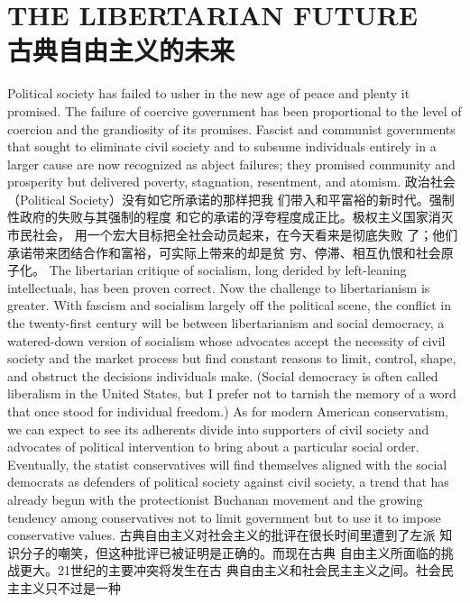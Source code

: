 \chapter{THE LIBERTARIAN FUTURE\\古典自由主义的未来}
\begin{paracol}{2}

Political society has failed to usher in the new age of
peace and plenty it promised. The failure of coercive
government has been proportional to the level of coercion and
the grandiosity of its promises. Fascist and communist governments that sought to eliminate civil society and to subsume individuals entirely in a larger cause are now recognized as abject
failures; they promised community and prosperity but delivered poverty, stagnation, resentment, and atomism.
\switchcolumn
政治社会（Political Society）没有如它所承诺的那样把我
们带入和平富裕的新时代。强制性政府的失败与其强制的程度
和它的承诺的浮夸程度成正比。极权主义国家消灭市民社会，
用一个宏大目标把全社会动员起来，在今天看来是彻底失败
了；他们承诺带来团结合作和富裕，可实际上带来的却是贫
穷、停滞、相互仇恨和社会原子化。
\switchcolumn*
The libertarian critique of socialism, long derided by left-leaning intellectuals, has been proven correct. Now the challenge to libertarianism is greater. With fascism and socialism
largely off the political scene, the conflict in the twenty-first
century will be between libertarianism and social democracy, a
watered-down version of socialism whose advocates accept the
necessity of civil society and the market process but find constant reasons to limit, control, shape, and obstruct the decisions
individuals make. (Social democracy is often called liberalism in
the United States, but I prefer not to tarnish the memory of a
word that once stood for individual freedom.) As for modern
American conservatism, we can expect to see its adherents divide into supporters of civil society and advocates of political
intervention to bring about a particular social order. Eventually, the statist conservatives will find themselves aligned with
the social democrats as defenders of political society against civil society, a trend that has already begun with the protectionist Buchanan movement and the growing tendency among conservatives not to limit government but to use it to impose
conservative values.
\switchcolumn
古典自由主义对社会主义的批评在很长时间里遭到了左派
知识分子的嘲笑，但这种批评已被证明是正确的。而现在古典
自由主义所面临的挑战更大。21世纪的主要冲突将发生在古
典自由主义和社会民主主义之间。社会民主主义只不过是一种

\end{paracol}
